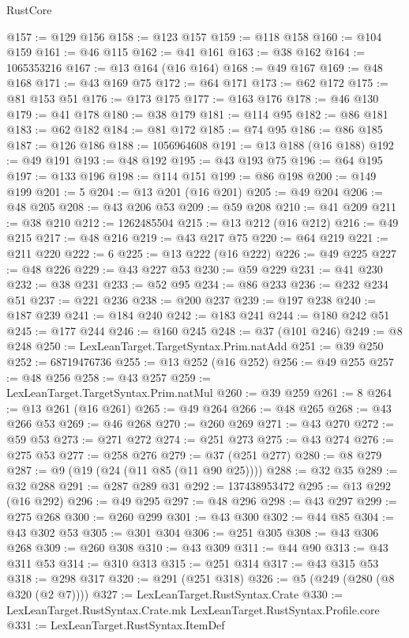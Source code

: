 \begin{lexlean}{RustCore}
\begin{coremodule}
@157 := @129 @156
@158 := @123 @157
@159 := @118 @158
@160 := @104 @159
@161 := @46 @115
@162 := @41 @161
@163 := @38 @162
@164 := 1065353216
@167 := @13 @164 (@16 @164)
@168 := @49 @167
@169 := @48 @168
@171 := @43 @169 @75
@172 := @64 @171
@173 := @62 @172
@175 := @81 @153 @51
@176 := @173 @175
@177 := @163 @176
@178 := @46 @130
@179 := @41 @178
@180 := @38 @179
@181 := @114 @95
@182 := @86 @181
@183 := @62 @182
@184 := @81 @172
@185 := @74 @95
@186 := @86 @185
@187 := @126 @186
@188 := 1056964608
@191 := @13 @188 (@16 @188)
@192 := @49 @191
@193 := @48 @192
@195 := @43 @193 @75
@196 := @64 @195
@197 := @133 @196
@198 := @114 @151
@199 := @86 @198
@200 := @149 @199
@201 := 5
@204 := @13 @201 (@16 @201)
@205 := @49 @204
@206 := @48 @205
@208 := @43 @206 @53
@209 := @59 @208
@210 := @41 @209
@211 := @38 @210
@212 := 1262485504
@215 := @13 @212 (@16 @212)
@216 := @49 @215
@217 := @48 @216
@219 := @43 @217 @75
@220 := @64 @219
@221 := @211 @220
@222 := 6
@225 := @13 @222 (@16 @222)
@226 := @49 @225
@227 := @48 @226
@229 := @43 @227 @53
@230 := @59 @229
@231 := @41 @230
@232 := @38 @231
@233 := @52 @95
@234 := @86 @233
@236 := @232 @234 @51
@237 := @221 @236
@238 := @200 @237
@239 := @197 @238
@240 := @187 @239
@241 := @184 @240
@242 := @183 @241
@244 := @180 @242 @51
@245 := @177 @244
@246 := @160 @245
@248 := @37 (@101 @246)
@249 := @8 @248
@250 := LexLeanTarget.TargetSyntax.Prim.natAdd
@251 := @39 @250
@252 := 68719476736
@255 := @13 @252 (@16 @252)
@256 := @49 @255
@257 := @48 @256
@258 := @43 @257
@259 := LexLeanTarget.TargetSyntax.Prim.natMul
@260 := @39 @259
@261 := 8
@264 := @13 @261 (@16 @261)
@265 := @49 @264
@266 := @48 @265
@268 := @43 @266 @53
@269 := @46 @268
@270 := @260 @269
@271 := @43 @270
@272 := @59 @53
@273 := @271 @272
@274 := @251 @273
@275 := @43 @274
@276 := @275 @53
@277 := @258 @276
@279 := @37 (@251 @277)
@280 := @8 @279
@287 := @9 (@19 (@24 (@11 @85 (@11 @90 @25))))
@288 := @32 @35
@289 := @32 @288
@291 := @287 @289 @31
@292 := 137438953472
@295 := @13 @292 (@16 @292)
@296 := @49 @295
@297 := @48 @296
@298 := @43 @297
@299 := @275 @268
@300 := @260 @299
@301 := @43 @300
@302 := @44 @85
@304 := @43 @302 @53
@305 := @301 @304
@306 := @251 @305
@308 := @43 @306 @268
@309 := @260 @308
@310 := @43 @309
@311 := @44 @90
@313 := @43 @311 @53
@314 := @310 @313
@315 := @251 @314
@317 := @43 @315 @53
@318 := @298 @317
@320 := @291 (@251 @318)
@326 := @5 (@249 (@280 (@8 @320 (@2 @7))))
@327 := LexLeanTarget.RustSyntax.Crate
@330 := LexLeanTarget.RustSyntax.Crate.mk LexLeanTarget.RustSyntax.Profile.core
@331 := LexLeanTarget.RustSyntax.ItemDef

\end{coremodule}
\end{lexlean}
